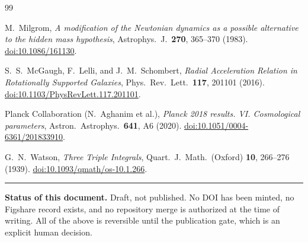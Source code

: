 \documentclass[11pt,a4paper]{article}
\begin{document}
\vspace{0.5em}

\begin{thebibliography}{99}
\raggedright

 M.~Milgrom, \emph{A modification of the Newtonian dynamics as a possible alternative to the hidden mass hypothesis}, Astrophys.\ J.\ \textbf{270}, 365--370 (1983). \href{https://doi.org/10.1086/161130}{doi:10.1086/161130}.

 S.~S.~McGaugh, F.~Lelli, and J.~M.~Schombert, \emph{Radial Acceleration Relation in Rotationally Supported Galaxies}, Phys.\ Rev.\ Lett.\ \textbf{117}, 201101 (2016). \href{https://doi.org/10.1103/PhysRevLett.117.201101}{doi:10.1103/PhysRevLett.117.201101}.

 Planck Collaboration (N.~Aghanim et al.), \emph{Planck 2018 results. VI. Cosmological parameters}, Astron.\ Astrophys.\ \textbf{641}, A6 (2020). \href{https://doi.org/10.1051/0004-6361/201833910}{doi:10.1051/0004-6361/201833910}.

 G.~N.~Watson, \emph{Three Triple Integrals}, Quart.\ J.\ Math.\ (Oxford) \textbf{10}, 266--276 (1939). \href{https://doi.org/10.1093/qmath/os-10.1.266}{doi:10.1093/qmath/os-10.1.266}.

\end{thebibliography}

\vspace{1em}
\color{rulegray}\hrule\color{black}

\vspace{0.5em}
\noindent\textbf{Status of this document.} Draft, not published. No DOI has been minted, no Figshare record exists, and no repository merge is authorized at the time of writing. All of the above is reversible until the publication gate, which is an explicit human decision.
\end{document}
